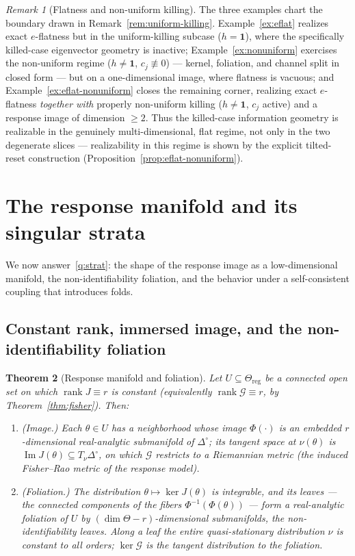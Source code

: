 \documentclass[11pt,reqno]{amsart}
\theoremstyle{plain}
\newtheorem{theorem}{Theorem}[section]
\theoremstyle{definition}
\theoremstyle{remark}
\newtheorem{remark}[theorem]{Remark}
\newcommand{\Reg}{\Theta_{\mathrm{reg}}}
\newcommand{\Simp}{\Delta^{\!\circ}}
\newcommand{\one}{\mathbf{1}}
\DeclareMathOperator{\rank}{rank}
\DeclareMathOperator{\Imm}{Im}
\begin{document}
\begin{remark}[Flatness and non-uniform killing]\label{rem:flatness-boundary}
The three examples chart the boundary drawn in Remark~\ref{rem:uniform-killing}.
Example~\ref{ex:eflat} realizes exact $e$-flatness but in the uniform-killing subcase
($h=\one$), where the specifically killed-case eigenvector geometry is inactive;
Example~\ref{ex:nonuniform} exercises the non-uniform regime ($h\neq\one$, $c_j\not\equiv0$)
--- kernel, foliation, and channel split in closed form --- but on a one-dimensional image,
where flatness is vacuous; and Example~\ref{ex:eflat-nonuniform} closes the remaining corner,
realizing exact $e$-flatness \emph{together with} properly non-uniform killing ($h\neq\one$,
$c_j$ active) and a response image of dimension $\ge2$. Thus the killed-case information
geometry is realizable in the genuinely multi-dimensional, flat regime, not only in the two
degenerate slices --- realizability in this regime is shown by the explicit tilted-reset
construction (Proposition~\ref{prop:eflat-nonuniform}).
\end{remark}


\section{The response manifold and its singular strata}\label{sec:manifold}


We now answer~\ref{q:strat}: the shape of the response image as a low-dimensional
manifold, the non-identifiability foliation, and the behavior under a
self-consistent coupling that introduces folds.

\subsection{Constant rank, immersed image, and the non-identifiability foliation}

\begin{theorem}[Response manifold and foliation]\label{thm:rank}
Let $U\subseteq\Reg$ be a connected open set on which $\rank J\equiv r$ is constant
\textup{(}equivalently $\rank\mathcal G\equiv r$, by Theorem~\ref{thm:fisher}\textup{)}.
Then:
\begin{enumerate}[label=\textup{(\roman*)}]
\item \textup{(Image.)} Each $\theta\in U$ has a neighborhood whose image
$\Phi(\cdot)$ is an embedded $r$-dimensional real-analytic submanifold of $\Simp$;
its tangent space at $\nu(\theta)$ is $\Imm J(\theta)\subseteq T_\nu\Simp$, on which
$\mathcal G$ restricts to a Riemannian metric \textup{(}the induced Fisher--Rao
metric of the response model\textup{)}.
\item \textup{(Foliation.)} The distribution $\theta\mapsto\ker J(\theta)$ is
integrable, and its leaves --- the connected components of the fibers
$\Phi^{-1}(\Phi(\theta))$ --- form a real-analytic foliation of $U$ by
$(\dim\Theta-r)$-dimensional submanifolds, the \emph{non-identifiability leaves}.
Along a leaf the entire quasi-stationary distribution $\nu$ is constant to all
orders; $\ker\mathcal G$ is the tangent distribution to the foliation.
\end{enumerate}
\end{theorem}
\end{document}
